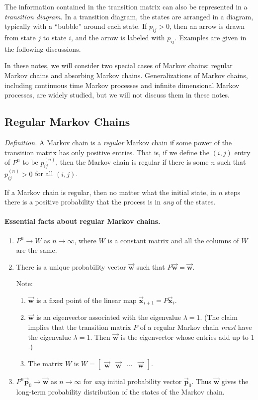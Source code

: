 \documentclass[reqno]{immbook}
\newcommand{\BP}{\vec{\textbf{p}}}
\newcommand{\BW}{\vec{\textbf{w}}}
\newcommand{\BX}{\vec{\textbf{x}}}
\begin{document}
The information contained in the transition matrix
can also be represented in a \emph{transition diagram}.
In a transition diagram, the states are arranged
in a diagram, typically with a ``bubble''
around each state.
If $p_{ij} > 0$, then an
arrow is drawn from state $j$ to state $i$, and the
arrow is labeled with $p_{ij}$.  Examples are given
in the following discussions.

In these notes, we will consider two special cases
of Markov chains: regular Markov chains and absorbing
Markov chains.
Generalizations of Markov chains, including
continuous time Markov processes and infinite
dimensional Markov processes, are widely studied,
but we will not discuss them in these notes.
%
%
\subsection*{Regular Markov Chains}

\noindent
\emph{Definition.} A Markov chain is a \emph{regular}
Markov chain if some power of the transition
matrix has only positive entries.
That is, if we define the $(i,j)$ entry of $P^n$
to be $p_{ij}^{(n)}$, then the Markov chain is
regular if there is some $n$ such that
$p_{ij}^{(n)}> 0$ for all $(i,j)$.

\medskip
If a Markov chain is regular, then no matter what the
initial state, in $n$ steps there is a positive
probability that the process is in \emph{any} of the states.

\paragraph{Essential facts about regular Markov chains.}
\begin{enumerate}
\item
$P^n\rightarrow W$ as $n\rightarrow\infty$, where
$W$ is a constant matrix and all the columns of
$W$ are the same.
\item There is a unique probability vector
$\BW$ such that $P\BW = \BW$.

Note:
\begin{enumerate}
\item $\BW$ is a fixed point of the linear map $\BX_{i+1} = P\BX_i$.
\item $\BW$ is an eigenvector associated with the eigenvalue $\lambda=1$.
(The claim implies that the transition matrix $P$ of a regular
Markov chain \emph{must} have the eigenvalue $\lambda=1$.
Then $\BW$ is the eigenvector whose entries add up to $1$.)
\item The matrix $W$ is $W = \begin{bmatrix} \BW & \BW & \cdots & \BW\end{bmatrix}$.
\end{enumerate}
\item $P^n\BP_0 \rightarrow \BW$ as $n\rightarrow\infty$ for \emph{any}
initial probability vector $\BP_0$.
Thus $\BW$ gives the long-term probability distribution of the
states of the Markov chain.
\end{enumerate}
\end{document}
